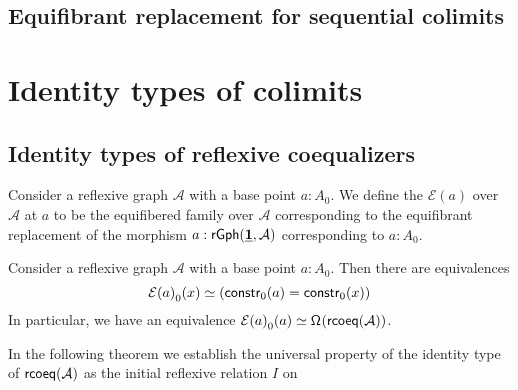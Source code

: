 \subsection{Equifibrant replacement for sequential colimits}

\section{Identity types of colimits}
\subsection{Identity types of reflexive coequalizers}

\begin{defn}
Consider a reflexive graph $\mathcal{A}$ with a base point $a:A_0$. We define the  $\mathcal{E}(a)$ over $\mathcal{A}$ at $a$ to be the equifibered family over $\mathcal{A}$ corresponding to the equifibrant replacement of the morphism $a:\mathsf{rGph}(\underline{\mathbf{1}},\mathcal{A})$ corresponding to $a:A_0$. 
\end{defn}

\begin{thm}
Consider a reflexive graph $\mathcal{A}$ with a base point $a:A_0$. Then there are equivalences
\begin{equation*}
\pts{\mathcal{E}(a)}(x) \eqvsym (\mathsf{constr}_0(a)=\mathsf{constr}_0(x))
\end{equation*}
In particular, we have an equivalence $\eqv{\pts{\mathcal{E}(a)}(a)}{\loopspace{\rcoeq(\mathcal{A})}}$. 
\end{thm}

In the following theorem we establish the universal property of the identity type of $\mathsf{rcoeq}(\mathcal{A})$ as the initial reflexive relation $I$ on 

